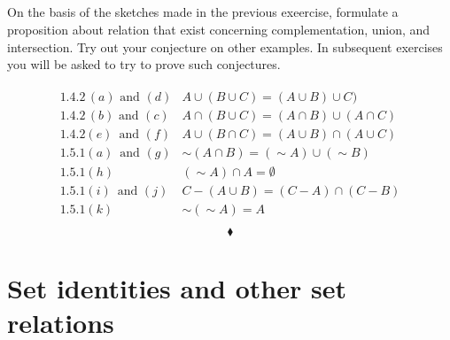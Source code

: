 \subsection{}
\begin{tcolorbox}
On the basis of the sketches made in the previous exeercise, formulate a proposition about relation that exist concerning complementation, union, and intersection. Try out your conjecture on other examples. In subsequent exercises you will be asked to try to prove such conjectures.
\end{tcolorbox}
\begin{align*}
\begin{array}{ll}
 1.4.2\, (a)\text{ and } (d) &A\cup(B\cup C)= (A\cup B)\cup C)\\
 1.4.2\, (b)\text{ and } (c)& A\cap(B\cup C)= (A\cap B)\cup (A\cap C)\\
 1.4.2(e)\,\text{ and }(f) &A\cup (B\cap C)= (A\cup B)\cap (A\cup C)\\
  1.5.1(a)\,\text{ and }(g) &\sim(A\cap B)=(\sim A)\cup(\sim B)\\
  1.5.1(h)&(\sim A)\cap A=\emptyset\\
  1.5.1(i)\,\text{ and }(j) &C-(A\cup B) = (C-A)\cap (C-B)\\
    1.5.1(k)&\sim (\sim A)=A\\
\end{array}
\end{align*}
$$\blacklozenge$$
\newpage

 \section{Set identities and other set relations}
